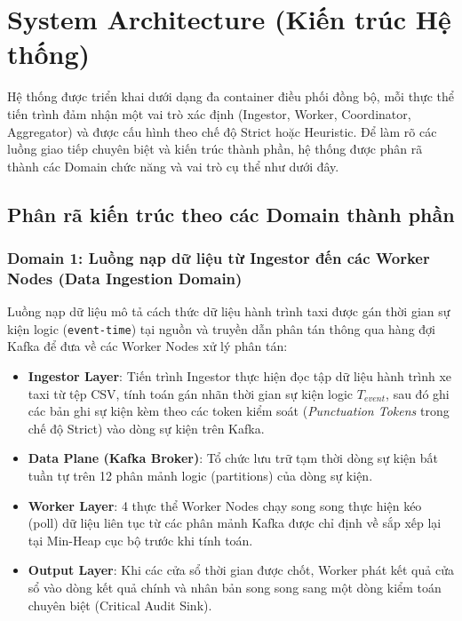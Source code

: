 \documentclass[12pt,a4paper]{article}
\begin{document}
\section{System Architecture (Kiến trúc Hệ thống)}

Hệ thống được triển khai dưới dạng đa container điều phối đồng bộ, mỗi thực thể tiến trình đảm nhận một vai trò xác định (Ingestor, Worker, Coordinator, Aggregator) và được cấu hình theo chế độ Strict hoặc Heuristic. Để làm rõ các luồng giao tiếp chuyên biệt và kiến trúc thành phần, hệ thống được phân rã thành các Domain chức năng và vai trò cụ thể như dưới đây.

\subsection{Phân rã kiến trúc theo các Domain thành phần}

\subsubsection{Domain 1: Luồng nạp dữ liệu từ Ingestor đến các Worker Nodes (Data Ingestion Domain)}
Luồng nạp dữ liệu mô tả cách thức dữ liệu hành trình taxi được gán thời gian sự kiện logic (\texttt{event-time}) tại nguồn và truyền dẫn phân tán thông qua hàng đợi Kafka để đưa về các Worker Nodes xử lý phân tán:
\begin{itemize}[leftmargin=*]
    \item \textbf{Ingestor Layer}: Tiến trình Ingestor thực hiện đọc tập dữ liệu hành trình xe taxi từ tệp CSV, tính toán gán nhãn thời gian sự kiện logic $T_{event}$, sau đó ghi các bản ghi sự kiện kèm theo các token kiểm soát (\textit{Punctuation Tokens} trong chế độ Strict) vào dòng sự kiện trên Kafka.
    \item \textbf{Data Plane (Kafka Broker)}: Tổ chức lưu trữ tạm thời dòng sự kiện bất tuần tự trên 12 phân mảnh logic (partitions) của dòng sự kiện.
    \item \textbf{Worker Layer}: 4 thực thể Worker Nodes chạy song song thực hiện kéo (poll) dữ liệu liên tục từ các phân mảnh Kafka được chỉ định về sắp xếp lại tại Min-Heap cục bộ trước khi tính toán.
    \item \textbf{Output Layer}: Khi các cửa sổ thời gian được chốt, Worker phát kết quả cửa sổ vào dòng kết quả chính và nhân bản song song sang một dòng kiểm toán chuyên biệt (Critical Audit Sink).
\end{itemize}
\end{document}
